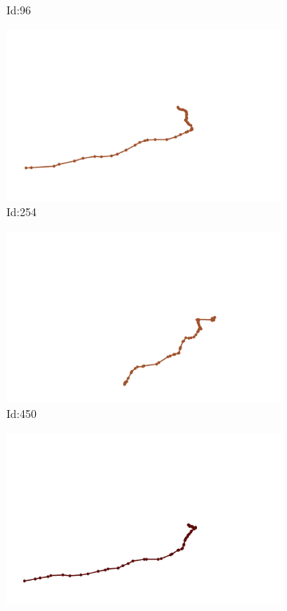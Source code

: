 \documentclass[12pt,twoside]{report}
\begin{document}
\begin{figure}
\begin{subfigure}[b]{0.20\textwidth}
\caption{Id:96}
\end{subfigure}
\begin{subfigure}[b]{0.20\textwidth}
\centering
\includegraphics[width=\textwidth]{../../trajectories/254.png}
\caption{Id:254}
\end{subfigure}
\begin{subfigure}[b]{0.20\textwidth}
\centering
\includegraphics[width=\textwidth]{../../trajectories/450.png}
\caption{Id:450}
\end{subfigure}
\begin{subfigure}[b]{0.20\textwidth}
\centering
\includegraphics[width=\textwidth]{../../trajectories/589.png}

\end{subfigure}
\end{figure}
\end{document}
